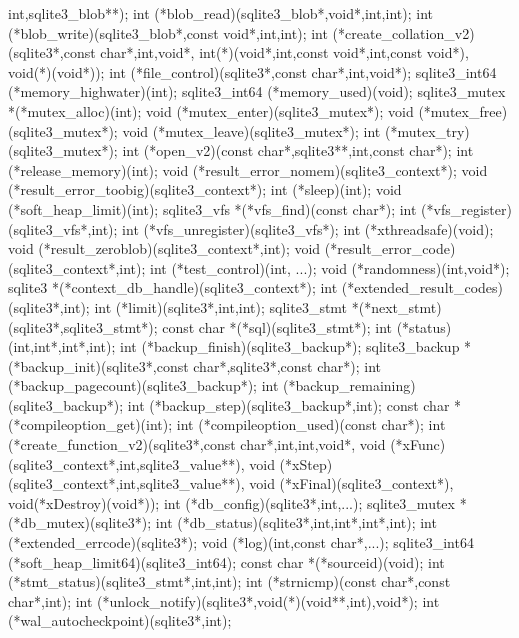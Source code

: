 \begin{Codex}[label=sqlite3ext.h,numbers=left]
{                   int,sqlite3_blob**);
  int (*blob_read)(sqlite3_blob*,void*,int,int);
  int (*blob_write)(sqlite3_blob*,const void*,int,int);
  int (*create_collation_v2)(sqlite3*,const char*,int,void*,
                             int(*)(void*,int,const void*,int,const void*),
                             void(*)(void*));
  int (*file_control)(sqlite3*,const char*,int,void*);
  sqlite3_int64 (*memory_highwater)(int);
  sqlite3_int64 (*memory_used)(void);
  sqlite3_mutex *(*mutex_alloc)(int);
  void (*mutex_enter)(sqlite3_mutex*);
  void (*mutex_free)(sqlite3_mutex*);
  void (*mutex_leave)(sqlite3_mutex*);
  int (*mutex_try)(sqlite3_mutex*);
  int (*open_v2)(const char*,sqlite3**,int,const char*);
  int (*release_memory)(int);
  void (*result_error_nomem)(sqlite3_context*);
  void (*result_error_toobig)(sqlite3_context*);
  int (*sleep)(int);
  void (*soft_heap_limit)(int);
  sqlite3_vfs *(*vfs_find)(const char*);
  int (*vfs_register)(sqlite3_vfs*,int);
  int (*vfs_unregister)(sqlite3_vfs*);
  int (*xthreadsafe)(void);
  void (*result_zeroblob)(sqlite3_context*,int);
  void (*result_error_code)(sqlite3_context*,int);
  int (*test_control)(int, ...);
  void (*randomness)(int,void*);
  sqlite3 *(*context_db_handle)(sqlite3_context*);
  int (*extended_result_codes)(sqlite3*,int);
  int (*limit)(sqlite3*,int,int);
  sqlite3_stmt *(*next_stmt)(sqlite3*,sqlite3_stmt*);
  const char *(*sql)(sqlite3_stmt*);
  int (*status)(int,int*,int*,int);
  int (*backup_finish)(sqlite3_backup*);
  sqlite3_backup *(*backup_init)(sqlite3*,const char*,sqlite3*,const char*);
  int (*backup_pagecount)(sqlite3_backup*);
  int (*backup_remaining)(sqlite3_backup*);
  int (*backup_step)(sqlite3_backup*,int);
  const char *(*compileoption_get)(int);
  int (*compileoption_used)(const char*);
  int (*create_function_v2)(sqlite3*,const char*,int,int,void*,
                            void (*xFunc)(sqlite3_context*,int,sqlite3_value**),
                            void (*xStep)(sqlite3_context*,int,sqlite3_value**),
                            void (*xFinal)(sqlite3_context*),
                            void(*xDestroy)(void*));
  int (*db_config)(sqlite3*,int,...);
  sqlite3_mutex *(*db_mutex)(sqlite3*);
  int (*db_status)(sqlite3*,int,int*,int*,int);
  int (*extended_errcode)(sqlite3*);
  void (*log)(int,const char*,...);
  sqlite3_int64 (*soft_heap_limit64)(sqlite3_int64);
  const char *(*sourceid)(void);
  int (*stmt_status)(sqlite3_stmt*,int,int);
  int (*strnicmp)(const char*,const char*,int);
  int (*unlock_notify)(sqlite3*,void(*)(void**,int),void*);
  int (*wal_autocheckpoint)(sqlite3*,int);
}
\end{Codex}
